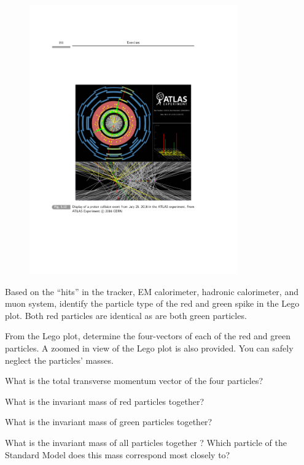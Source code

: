 {\begin{itemize}
{\begin{figure}[h!]
\centering
\includegraphics[width=0.8\textwidth]{./EventDisplay.pdf}
\end{figure}

\item[d.]{ Based on the “hits” in the tracker, EM calorimeter, hadronic calorimeter, and muon system, identify the particle type of the red and green spike in the Lego plot. 
Both red particles are identical as are both green particles.}
\item[e.]{
From the Lego plot, determine the four-vectors of each of the red and green particles. 
A zoomed in view of the Lego plot is also provided. You can safely neglect the particles’ masses. 
}
\item[f.]{
What is the total transverse momentum vector of the four particles?
}
\item[h.]{What is the invariant mass of red particles together? }
\item[i.]{What is the invariant mass of green particles together? }
\item[j.]{What is the invariant mass of all particles together ? Which particle of the Standard Model does this mass correspond most closely to?}

}
\end{itemize}}
